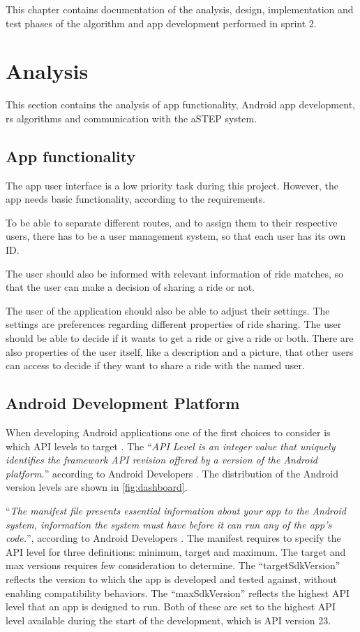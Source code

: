 This chapter contains documentation of the analysis, design, implementation and test phases of the algorithm and app development performed in sprint 2.
\section{Analysis}
This section contains the analysis of app functionality, Android app development, \gls{rs} algorithms and communication with the aSTEP system.

\subsection{App functionality}
The app user interface is a low priority task during this project.
However, the app needs basic functionality, according to the requirements.

To be able to separate different routes, and to assign them to their respective users, there has to be a user management system, so that each user has its own ID.

The user should also be informed with relevant information of ride matches, so that the user can make a decision of sharing a ride or not.

The user of the application should also be able to adjust their settings.
The settings are preferences regarding different properties of ride sharing.
The user should be able to decide if it wants to get a ride or give a ride or both.
There are also properties of the user itself, like a description and a picture, that other users can access to decide if they want to share a ride with the named user.






\subsection{Android Development Platform}
When developing Android applications one of the first choices to consider is which API levels to target \cite{usesSDK}.
The ``\textit{API Level is an integer value that uniquely identifies the framework API revision offered by a version of the Android platform.}'' according to Android Developers \cite{usesSDK}.
The distribution of the Android version levels are shown in \ref{fig:dashboard}.

``\textit{The manifest file presents essential information about your app to the Android system, information the system must have before it can run any of the app's code.}'', according to Android Developers \cite{androidManifest}.
The manifest requires to specify the API level for three definitions: minimum, target and maximum. 
The target and max versions requires few consideration to determine.
The ``targetSdkVersion'' reflects the version to which the app is developed and tested against, without enabling compatibility behaviors.
The ``maxSdkVersion'' reflects the highest API level that an app is designed to run.
Both of these are set to the highest API level available during the start of the development, which is API version 23.

